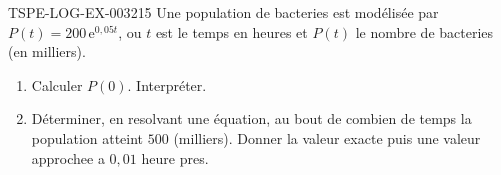 \begin{exercice}{TSPE-LOG-EX-003}{2}{15}
Une population de bacteries est modélisée par $P(t) = 200\,\mathrm{e}^{0{,}05t}$, ou $t$ est le temps en heures et $P(t)$ le nombre de bacteries (en milliers).
\begin{enumerate}
  \item Calculer $P(0)$. Interpréter.
  \item Déterminer, en resolvant une équation, au bout de combien de temps la population atteint $500$ (milliers). Donner la valeur exacte puis une valeur approchee a $0{,}01$ heure pres.
\end{enumerate}
\end{exercice}
